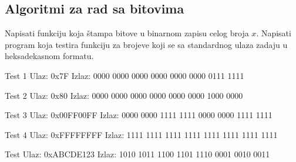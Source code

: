 \begin{Exercise}[label=004]


\section{Algoritmi za rad sa bitovima}

\begin{Exercise}[label=201]
Napisati funkciju  koja štampa bitove u binarnom zapisu celog broja $x$. Napisati program koja testira funkciju  za brojeve koji se sa standardnog ulaza zadaju u heksadekasnom formatu.


\begin{maxitest}
\begin{test}{Test 1}
Ulaz:   0x7F  
Izlaz:  0000 0000 0000 0000 0000 0000 0111 1111    
\end{test}
\end{maxitest}

\begin{maxitest}
\begin{test}{Test 2}
Ulaz:   0x80
Izlaz:  0000 0000 0000 0000 0000 0000 1000 0000 
\end{test}
\end{maxitest}

\begin{maxitest}
\begin{test}{Test 3}
Ulaz:   0x00FF00FF
Izlaz:  0000 0000 1111 1111 0000 0000 1111 1111
\end{test}
\end{maxitest}

\begin{maxitest}
\begin{test}{Test 4}
Ulaz:   0xFFFFFFFF
Izlaz:  1111 1111 1111 1111 1111 1111 1111 1111 
\end{test}
\end{maxitest}

\begin{maxitest}
\begin{test}{Test }
Ulaz:   0xABCDE123
Izlaz:  1010 1011 1100 1101 1110 0001 0010 0011
\end{test}
\end{maxitest}

\end{Exercise}
\begin{Answer}[ref=201]
\end{Answer}


\end{Exercise}
